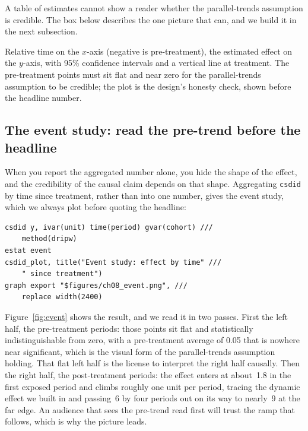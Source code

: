 \documentclass[
    a4paper,
    fontsize=10pt,
    twoside=true,
    numbers=noenddot,
]{kaobook}
\newenvironment{vizcallout}[1][Visualization to build]{%
    \begin{vizbox}[frametitle={#1}]%
}{%
    \end{vizbox}%
}
\begin{document}
A table of estimates cannot show a reader whether the parallel-trends assumption is credible. The box below describes the one picture that can, and we build it in the next subsection.

\begin{vizcallout}[Visualization to build: the event-study plot]
Relative time on the $x$-axis (negative is pre-treatment), the estimated effect on the $y$-axis, with 95\% confidence intervals and a vertical line at treatment. The pre-treatment points must sit flat and near zero for the parallel-trends assumption to be credible; the plot is the design's honesty check, shown before the headline number.
\end{vizcallout}

\subsection{The event study: read the pre-trend before the headline}
When you report the aggregated number alone, you hide the shape of the effect, and the credibility of the causal claim depends on that shape. Aggregating \texttt{csdid} by time since treatment, rather than into one number, gives the event study, which we always plot before quoting the headline:
\par
{\footnotesize
\begin{verbatim}
csdid y, ivar(unit) time(period) gvar(cohort) ///
    method(dripw)
estat event
csdid_plot, title("Event study: effect by time" ///
    " since treatment")
graph export "$figures/ch08_event.png", ///
    replace width(2400)
\end{verbatim}
}
Figure~\ref{fig:event} shows the result, and we read it in two passes. First the left half, the pre-treatment periods: those points sit flat and statistically indistinguishable from zero, with a pre-treatment average of 0.05 that is nowhere near significant, which is the visual form of the parallel-trends assumption holding. That flat left half is the license to interpret the right half causally. Then the right half, the post-treatment periods: the effect enters at about~1.8 in the first exposed period and climbs roughly one unit per period, tracing the dynamic effect we built in and passing~6 by four periods out on its way to nearly~9 at the far edge. An audience that sees the pre-trend read first will trust the ramp that follows, which is why the picture leads.
\end{document}
